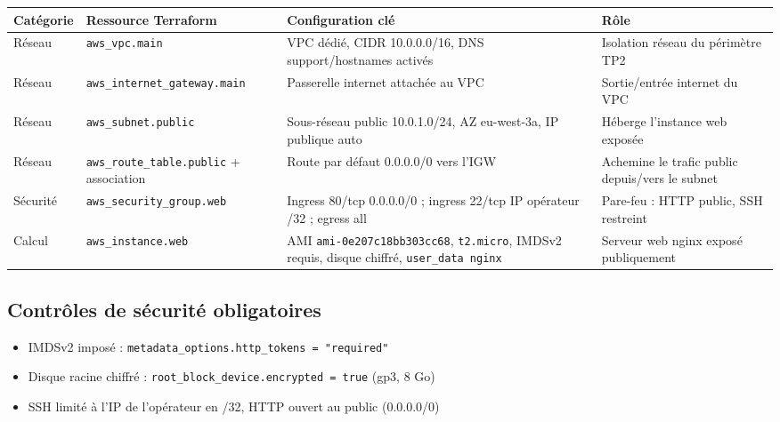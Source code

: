 \documentclass[11pt,a4paper]{article}
\begin{document}
\begin{longtable}{@{}p{2.1cm}p{3.1cm}p{5.2cm}p{4.2cm}@{}}
\toprule
\textbf{Catégorie} &
\textbf{Ressource Terraform} &
\textbf{Configuration clé} &
\textbf{Rôle} \\
\midrule
\endhead

Réseau &
\texttt{aws\_vpc.main} &
VPC dédié, CIDR 10.0.0.0/16,
DNS support/hostnames activés &
Isolation réseau du périmètre TP2 \\

Réseau &
\texttt{aws\_internet\_gateway.main} &
Passerelle internet attachée au VPC &
Sortie/entrée internet du VPC \\

Réseau &
\texttt{aws\_subnet.public} &
Sous-réseau public 10.0.1.0/24,
AZ eu-west-3a,
IP publique auto &
Héberge l'instance web exposée \\

Réseau &
\texttt{aws\_route\_table.public}
+ association &
Route par défaut
0.0.0.0/0 vers l'IGW &
Achemine le trafic public
depuis/vers le subnet \\

Sécurité &
\texttt{aws\_security\_group.web} &
Ingress 80/tcp 0.0.0.0/0 ;
ingress 22/tcp IP opérateur /32 ;
egress all &
Pare-feu :
HTTP public,
SSH restreint \\

Calcul &
\texttt{aws\_instance.web} &
AMI \texttt{ami-0e207c18bb303cc68},
\texttt{t2.micro},
IMDSv2 requis,
disque chiffré,
\texttt{user\_data nginx} &
Serveur web nginx exposé publiquement \\

\bottomrule
\end{longtable}


\subsection{Contrôles de sécurité obligatoires}

\begin{itemize}[leftmargin=1.2em]
    \item IMDSv2 imposé :
    \texttt{metadata\_options.http\_tokens = "required"}

    \item Disque racine chiffré :
    \texttt{root\_block\_device.encrypted = true}
    (gp3, 8 Go)

    \item SSH limité à l'IP de l'opérateur en /32,
    HTTP ouvert au public (0.0.0.0/0)
\end{itemize}
\end{document}
